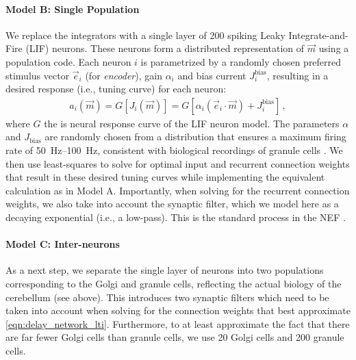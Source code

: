 \paragraph{Model B: Single Population}
We replace the integrators with a single layer of 200 spiking Leaky Integrate-and-Fire (LIF) neurons.
These neurons form a distributed representation of $\vec{m}$ using a population code.
Each neuron $i$ is parametrized by a randomly chosen preferred stimulus vector $\vec{e}_i$ (for \textit{encoder}), gain $\alpha_i$ and bias current $J^\mathrm{bias}_i$, resulting in a desired response (i.e., tuning curve) for each neuron:
\begin{align}
    a_i(\vec m) = G[J_i(\vec m)] = G[\alpha_i (\vec{e}_i \cdot \vec{m} ) + J^\mathrm{bias}_i] \,,
    \label{eqn:lif_tuning_curve}
\end{align}
where $G$ the is neural response curve of the LIF neuron model.
The parameters $\alpha$ and $J_\mathrm{bias}$ are randomly chosen from a distribution that ensures a maximum firing rate of \SIrange{50}{100}{\hertz}, consistent with biological recordings of granule cells \cite{chadderton2004integration}.
We then use least-squares to solve for optimal input and recurrent connection weights that result in these desired tuning curves while implementing the equivalent calculation as in Model A.
Importantly, when solving for the recurrent connection weights, we also take into account the synaptic filter, which we model here as a decaying exponential (i.e., a low-pass).
This is the standard process in the NEF \cite{eliasmith2003neural}.

\paragraph{Model C: Inter-neurons}
As a next step, we separate the single layer of neurons into two populations corresponding to the Golgi and granule cells, reflecting the actual biology of the cerebellum (see above). This introduces two synaptic filters which need to be taken into account when solving for the connection weights that best approximate \cref{eqn:delay_network_lti}.
Furthermore, to at least approximate the fact that there are far fewer Golgi cells than granule cells, we use 20 Golgi cells and 200 granule cells.

